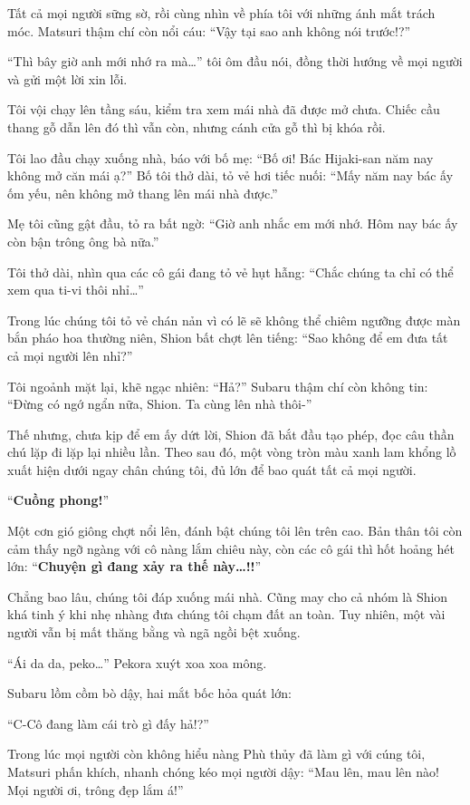 \documentclass[../main.tex]{subfiles}
\begin{document}
Tất cả mọi người sững sờ, rồi cùng nhìn về phía tôi với những ánh mắt trách móc. Matsuri thậm chí còn nổi cáu: ``Vậy tại sao anh không nói trước!?''

``Thì bây giờ anh mới nhớ ra mà\dots'' tôi ôm đầu nói, đồng thời hướng về mọi người và gửi một lời xin lỗi.

Tôi vội chạy lên tầng sáu, kiểm tra xem mái nhà đã được mở chưa. Chiếc cầu thang gỗ dẫn lên đó thì vẫn còn, nhưng cánh cửa gỗ thì bị khóa rồi.

Tôi lao đầu chạy xuống nhà, báo với bố mẹ: ``Bố ơi! Bác Hijaki-san năm nay không mở căn mái ạ?'' Bố tôi thở dài, tỏ vẻ hơi tiếc nuối: ``Mấy năm nay bác ấy ốm yếu, nên không mở thang lên mái nhà được.''

Mẹ tôi cũng gật đầu, tỏ ra bất ngờ: ``Giờ anh nhắc em mới nhớ. Hôm nay bác ấy còn bận trông ông bà nữa.''

Tôi thở dài, nhìn qua các cô gái đang tỏ vẻ hụt hẫng: ``Chắc chúng ta chỉ có thể xem qua ti-vi thôi nhỉ\dots''

Trong lúc chúng tôi tỏ vẻ chán nản vì có lẽ sẽ không thể chiêm ngưỡng được màn bắn pháo hoa thường niên, Shion bất chợt lên tiếng: ``Sao không để em đưa tất cả mọi người lên nhỉ?''

Tôi ngoảnh mặt lại, khẽ ngạc nhiên: ``Hả?'' Subaru thậm chí còn không tin: ``Đừng có ngớ ngẩn nữa, Shion. Ta cùng lên nhà thôi-''

Thế nhưng, chưa kịp để em ấy dứt lời, Shion đã bắt đầu tạo phép, đọc câu thần chú lặp đi lặp lại nhiều lần. Theo sau đó, một vòng tròn màu xanh lam khổng lồ xuất hiện dưới ngay chân chúng tôi, đủ lớn để bao quát tất cả mọi người.

``\textbf{Cuồng phong!}''

Một cơn gió giông chợt nổi lên, đánh bật chúng tôi lên trên cao. Bản thân tôi còn cảm thấy ngỡ ngàng với cô nàng lắm chiêu này, còn các cô gái thì hốt hoảng hét lớn: ``\textbf{Chuyện gì đang xảy ra thế này\dots!!}''

Chẳng bao lâu, chúng tôi đáp xuống mái nhà. Cũng may cho cả nhóm là Shion khá tinh ý khi nhẹ nhàng đưa chúng tôi chạm đất an toàn. Tuy nhiên, một vài người vẫn bị mất thăng bằng và ngã ngồi bệt xuống.

``Ái da da, peko\dots'' Pekora xuýt xoa xoa mông.

Subaru lồm cồm bò dậy, hai mắt bốc hỏa quát lớn:

``C-Cô đang làm cái trò gì đấy hả!?''

Trong lúc mọi người còn không hiểu nàng Phù thủy đã làm gì với cúng tôi, Matsuri phấn khích, nhanh chóng kéo mọi người dậy: ``Mau lên, mau lên nào! Mọi người ơi, trông đẹp lắm á!''
\end{document}
